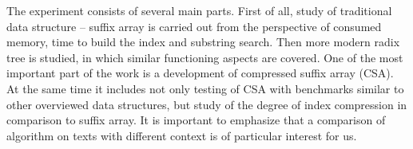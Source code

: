 
The experiment consists of several main parts.
First of all, study of traditional data structure -- suffix array is carried out
from the perspective of consumed memory, time to build the index and substring search.
Then more modern radix tree is studied, in which similar functioning aspects are covered.
One of the most important part of the work is a development of compressed suffix array (CSA).
At the same time it includes not only testing of CSA with benchmarks similar to other overviewed
data structures, but study of the degree of index compression in comparison to suffix array.
It is important to emphasize that a comparison of algorithm on texts with different context is of particular interest for us.
